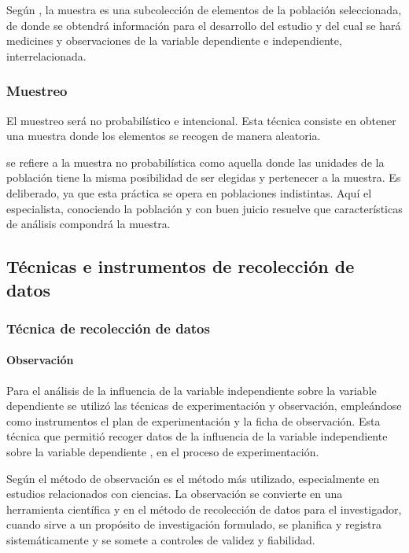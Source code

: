 \documentclass[12pt,a4paper]{article}
\begin{document}
Según \cite{hernandez_sampieri_metodologiinvestigacion_2014}, la muestra es una subcolección de elementos de la población seleccionada, de donde se obtendrá información para el desarrollo del estudio y del cual se hará medicines y observaciones de la variable dependiente e independiente, interrelacionada.

\subsubsection{Muestreo}

El muestreo será no probabilístico e intencional. Esta técnica consiste  en obtener una muestra donde los elementos  se recogen de manera aleatoria.

\cite{alzina_metodologiinvestigacion_2004} se refiere a la muestra no probabilística como aquella donde las unidades de la población tiene la misma posibilidad de ser elegidas y pertenecer a la muestra. Es deliberado, ya que esta práctica se opera en poblaciones indistintas. Aquí el especialista, conociendo la población y con buen juicio resuelve que características de análisis compondrá la muestra.


\subsection{Técnicas e instrumentos de recolección de datos}

\subsubsection{Técnica de recolección de datos}

\paragraph{Observación} Para el análisis de la influencia de la variable independiente sobre la variable dependiente se utilizó las técnicas de experimentación y observación, empleándose como instrumentos el plan de experimentación y la ficha de observación. Esta técnica que permitió recoger datos de la influencia de la variable independiente \MakeTextLowercase{\variablei} sobre la variable dependiente \MakeTextLowercase{\variabled}, en el proceso de experimentación.


%
Según \cite{paz_metodologiinvestigacion_2014} el método de observación es el método más utilizado, especialmente en estudios relacionados con ciencias. La observación se convierte en una herramienta científica y en el método de recolección de datos para el investigador, cuando sirve a un propósito de investigación formulado, se planifica y registra sistemáticamente y se somete a controles de validez y fiabilidad.
\end{document}
